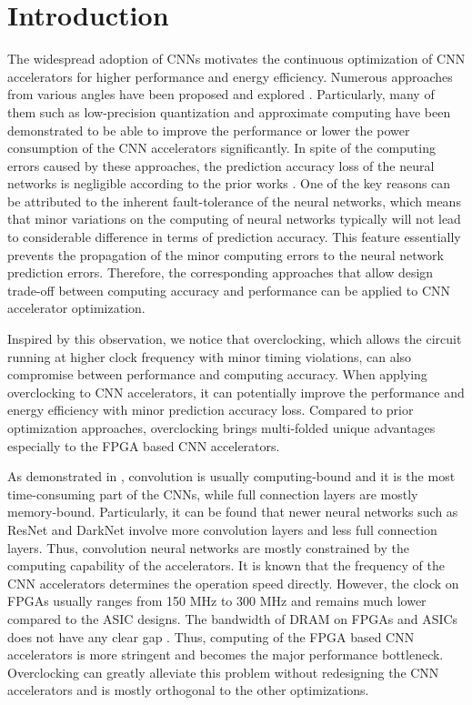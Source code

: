 \section{Introduction} \label{sec:intro}
The widespread adoption of CNNs motivates the 
continuous optimization of CNN accelerators for higher 
performance and energy efficiency. 
Numerous approaches from various 
angles have been proposed and explored \cite{EIE_han_2016} \cite{deepburing_12}. 
Particularly, many of them such as 
low-precision quantization \cite{Hwang2014_17} \cite{Matthieu2014_8} 
and approximate computing \cite{Approximate_Multiplier_31} \cite{Approximate_32}
have been demonstrated to 
be able to improve the performance or lower the power consumption of the CNN 
accelerators significantly. In spite of the computing errors caused by these approaches, 
the prediction accuracy loss of the neural networks is negligible according to the prior works \cite{deep_compress_han_2015}.
One of the key reasons can be attributed to the inherent fault-tolerance of 
the neural networks, which means that minor variations on the 
computing of neural networks typically will not lead to considerable 
difference in terms of prediction accuracy. This 
feature essentially prevents the propagation of 
the minor computing errors to the neural network prediction errors. 
Therefore, the corresponding approaches that allow design trade-off 
between computing accuracy and performance can be applied to CNN 
accelerator optimization.

Inspired by this observation, we notice that overclocking, which 
allows the circuit running at higher clock frequency with minor 
timing violations, can also compromise between performance 
and computing accuracy. When applying overclocking to CNN accelerators, 
it can potentially improve the performance and energy 
efficiency with minor prediction accuracy loss.
Compared to prior optimization approaches, overclocking brings 
multi-folded unique advantages especially to the FPGA based CNN 
accelerators. 


As demonstrated in \cite{Caffeine_6} \cite{EIE_han_2016}, convolution is usually 
computing-bound and it is the most time-consuming part of the CNNs, while 
full connection layers are mostly memory-bound. Particularly, it can be found that 
newer neural networks such as ResNet and DarkNet involve more 
convolution layers and less full connection layers. Thus, convolution neural 
networks are mostly constrained by the computing capability of the accelerators. 
It is known that the frequency of the CNN 
accelerators determines the operation speed directly. However, 
the clock on FPGAs usually ranges from 150 MHz to 300 MHz and 
remains much lower compared to the ASIC designs. The 
bandwidth of DRAM on FPGAs and ASICs does not have any 
clear gap \cite{asic_fpga}. Thus, computing of the FPGA based CNN 
accelerators is more stringent and becomes the major 
performance bottleneck. Overclocking can greatly alleviate this 
problem without redesigning the CNN accelerators and is 
mostly orthogonal to the other optimizations. 

